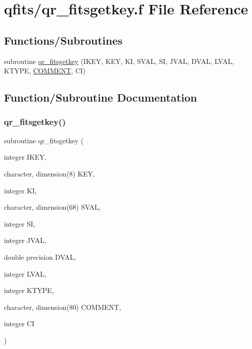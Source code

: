 \hypertarget{qr__fitsgetkey_8f}{}\section{qfits/qr\+\_\+fitsgetkey.f File Reference}
\label{qr__fitsgetkey_8f}
\subsection*{Functions/\+Subroutines}
\begin{DoxyCompactItemize}
\item 
subroutine \hyperlink{qr__fitsgetkey_8f_a3ec0736c4903eba0748dc3f6c17961bd}{qr\+\_\+fitsgetkey} (I\+K\+EY, K\+EY, KI, S\+V\+AL, SI, J\+V\+AL, D\+V\+AL, L\+V\+AL, K\+T\+Y\+PE, \hyperlink{inflate_8h_a164ea0159d5f0b5f12a646f25f99eceaaae696377c19e507b64e16be78ce3bbdb}{C\+O\+M\+M\+E\+NT}, CI)
\end{DoxyCompactItemize}


\subsection{Function/\+Subroutine Documentation}
\mbox{\label{qr__fitsgetkey_8f_a3ec0736c4903eba0748dc3f6c17961bd}} 
\subsubsection{\texorpdfstring{qr\+\_\+fitsgetkey()}{qr\_fitsgetkey()}}
{\footnotesize\ttfamily subroutine qr\+\_\+fitsgetkey (\begin{DoxyParamCaption}\item[{integer}]{I\+K\+EY,  }\item[{character, dimension(8)}]{K\+EY,  }\item[{integer}]{KI,  }\item[{character, dimension(68)}]{S\+V\+AL,  }\item[{integer}]{SI,  }\item[{integer}]{J\+V\+AL,  }\item[{double precision}]{D\+V\+AL,  }\item[{integer}]{L\+V\+AL,  }\item[{integer}]{K\+T\+Y\+PE,  }\item[{character, dimension(80)}]{C\+O\+M\+M\+E\+NT,  }\item[{integer}]{CI }\end{DoxyParamCaption})}

